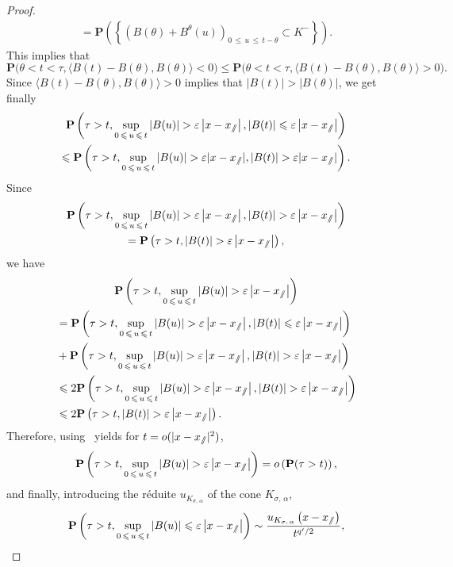 \documentclass[AHL,Unicode,longabstracts,published]{cedram}
\newcommand{\pr}{\mathbf{P}}
\renewcommand{\epsilon}{\varepsilon}
\renewcommand{\leq}{\leqslant}
\newcommand{\sslash}{\slash\mkern-6.4mu\slash}
\begin{document}
\begin{proof}
\begin{multline*}
=\pr\left(\left\{ \left(B(\theta)+B^{\theta}(u)\right)_{0\,\leq\,u\,\leq\,t-\theta}\subset K^{-}\right\}\right).
\end{multline*}
This implies that
\[
\pr\big(\theta<t<\tau, \big\langle B(t)-B(\theta),B(\theta)\big\rangle<0\big)\leq \pr\big(\theta<t<\tau, \big\langle B(t)-B(\theta),B(\theta)\big\rangle>0\big).
\]
Since $\langle B(t)-B(\theta),B(\theta)\rangle>0$ implies that $| B(t)|>| B(\theta)|$, we get finally
\begin{multline*}
\pr\left(\tau>t, \sup_{0\,\leq\,u\,\leq\,t}|B(u)|> \epsilon \left|x-x_{\sslash}\right|, |B(t)| \leq \epsilon \left|x-x_{\sslash}\right|\right)\\
\leq \pr\left(\tau>t, \sup_{0\,\leq\,u\,\leq\,t}| B(u)|> \epsilon | x-x_{\sslash}|, | B(t)| > \epsilon | x-x_{\sslash}|\right).
\end{multline*}
Since
\begin{multline*}
\pr\left(\tau>t, \sup_{0\,\leq\,u\,\leq\,t}|B(u)|> \epsilon \left|x-x_{\sslash}\right|, |B(t)| > \epsilon \left|x-x_{\sslash}\right|\right)\\
= \pr\left(\tau>t, |B(t)| > \epsilon \left|x-x_{\sslash}\right|\right),
\end{multline*}
we have
\begin{multline*}
\pr\left(\tau>t, \sup_{0\,\leq\,u\,\leq\,t}|B(u)|> \epsilon \left|x-x_{\sslash}\right|\right)\\
\begin{aligned}
&=\pr\left(\tau>t, \sup_{0\,\leq\,u\,\leq\,t}| B(u)|> \epsilon \left|x-x_{\sslash}\right|, | B(t)|\leq \epsilon \left|x-x_{\sslash}\right|\right)\\
&+\pr\left(\tau>t, \sup_{0\,\leq\,u\,\leq\,t}| B(u)|> \epsilon \left|x-x_{\sslash}\right|, | B(t)| > \epsilon \left|x-x_{\sslash}\right|\right)\\
&\leq 2\pr\left(\tau>t, \sup_{0\,\leq\,u\,\leq\,t}| B(u)|> \epsilon \left|x-x_{\sslash}\right|, |B(t)| > \epsilon \left|x-x_{\sslash}\right|\right)\\
&\leq 2\pr\left(\tau>t,|B(t)| > \epsilon \left|x-x_{\sslash}\right|\right).
\end{aligned}
\end{multline*}
Therefore, using~\cite[Lemma~18]{DeWa-15} yields for $t=o(|x-x_{\sslash}|^{2})$,
\[
\pr\left(\tau>t, \sup_{0\,\leq\,u\,\leq\,t}|B(u)|> \epsilon \left|x-x_{\sslash}\right|\right)=o\left(\pr(\tau>t)\right),
\]
and finally, introducing the réduite $u_{K_{\sigma,\,\alpha}}$ of the cone $K_{\sigma,\,\alpha}$,
\[
\pr\left(\tau>t, \sup_{0\,\leq\,u\,\leq\,t}| B(u)|\leq \epsilon \left|x-x_{\sslash}\right|\right)\sim \frac{u_{K_{\sigma,\,\alpha}}\left(x-x_{\sslash}\right)}{t^{q'/2}},
\]
\end{proof}
\end{document}
